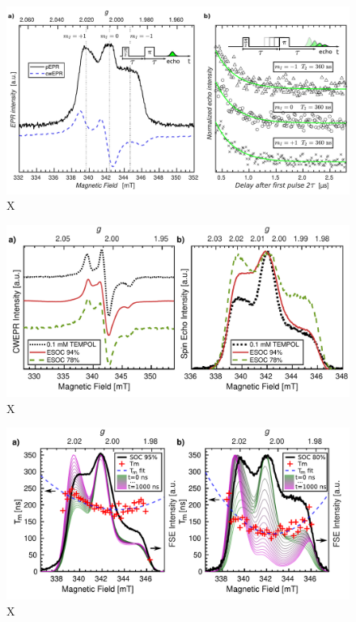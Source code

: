 \begin{figure}[h]
\center
	\includegraphics[width=1\textwidth]{./pulse/figures/SAW_Figure_8.pdf}
	\caption{X}
	\label{fig:FSE_vs_CW_DiTS_rel_times}
\end{figure}

\begin{figure}[h]
\center
	\includegraphics[width=1\textwidth]{./pulse/figures/Figure_3.pdf}
	\caption{X}
	\label{fig:FSE_vs_CW_DiTBuS}
\end{figure}

\begin{figure}[h]
\center
	\includegraphics[width=1\textwidth]{./pulse/figures/Figure_6_maintext_col_MOD.pdf}
	\caption{X}
	\label{fig:FSE_reconstruction_with_T2}
\end{figure}


